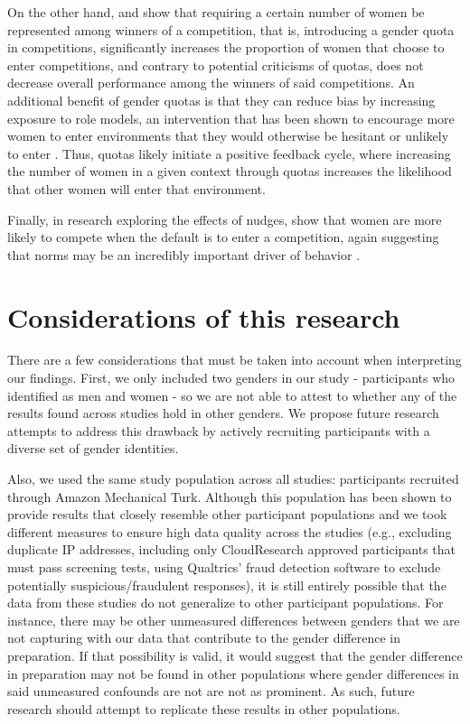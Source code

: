 \documentclass[letterpaper, nobind]{templates/ociamthesis}
\begin{document}
On the other hand, \textcite{Niederle2013} and \textcite{Balafoutas2012} show that requiring a certain number of women be represented among winners of a competition, that is, introducing a gender quota in competitions, significantly increases the proportion of women that choose to enter competitions, and contrary to potential criticisms of quotas, does not decrease overall performance among the winners of said competitions. An additional benefit of gender quotas is that they can reduce bias by increasing exposure to role models, an intervention that has been shown to encourage more women to enter environments that they would otherwise be hesitant or unlikely to enter \autocite{Porter2020,Busso2021,Carpio2021,Boneva2021,Ginther2020,Breda2021}. Thus, quotas likely initiate a positive feedback cycle, where increasing the number of women in a given context through quotas increases the likelihood that other women will enter that environment.

Finally, in research exploring the effects of nudges, \textcite{He2021} show that women are more likely to compete when the default is to enter a competition, again suggesting that norms may be an incredibly important driver of behavior \autocite[also see][]{Erkal2018}.

\hypertarget{considerations-of-this-research}{%
\section{Considerations of this research}\label{considerations-of-this-research}}

There are a few considerations that must be taken into account when interpreting our findings. First, we only included two genders in our study - participants who identified as men and women - so we are not able to attest to whether any of the results found across studies hold in other genders. We propose future research attempts to address this drawback by actively recruiting participants with a diverse set of gender identities.

Also, we used the same study population across all studies: participants recruited through Amazon Mechanical Turk. Although this population has been shown to provide results that closely resemble other participant populations \autocite{Rand2012,Buhrmester2011,Paolacci2014,Chandler2016} and we took different measures to ensure high data quality across the studies (e.g., excluding duplicate IP addresses, including only CloudResearch approved participants that must pass screening tests, using Qualtrics' fraud detection software to exclude potentially suspicious/fraudulent responses), it is still entirely possible that the data from these studies do not generalize to other participant populations. For instance, there may be other unmeasured differences between genders that we are not capturing with our data that contribute to the gender difference in preparation. If that possibility is valid, it would suggest that the gender difference in preparation may not be found in other populations where gender differences in said unmeasured confounds are not are not as prominent. As such, future research should attempt to replicate these results in other populations.
\end{document}
